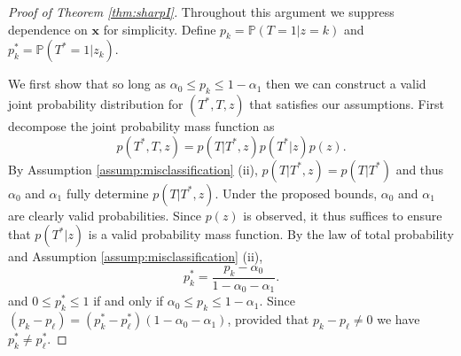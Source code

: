 \begin{proof}[Proof of Theorem \ref{thm:sharpI}]
  Throughout this argument we suppress dependence on $\mathbf{x}$ for simplicity. 
  Define $p_k = \mathbb{P}(T=1|z=k)$ and $p_k^* = \mathbb{P}(T^*=1|z_k)$.

We first show that so long as $\alpha_0 \leq p_k \leq 1 - \alpha_1$ then we can construct a valid joint probability distribution for $(T^*, T, z)$ that satisfies our assumptions.
First decompose the joint probability mass function as
\[
  p(T^*,T,z) = p(T|T^*,z)p(T^*|z)p(z).
\]
By Assumption \ref{assump:misclassification} (ii), $p(T|T^*,z) = p(T|T^*)$ and thus $\alpha_0$ and $\alpha_1$ fully determine $p(T|T^*,z)$.  
Under the proposed bounds, $\alpha_0$ and $\alpha_1$ are clearly valid probabilities.
Since $p(z)$ is observed, it thus suffices to ensure that $p(T^*|z)$ is a valid probability mass function.
By the law of total probability and Assumption \ref{assump:misclassification} (ii), 
\[
  p_k^* = \frac{p_k - \alpha_0}{1 - \alpha_0 - \alpha_1}.
\]
and $0 \leq p_k^* \leq 1$ if and only if $\alpha_0 \leq p_k \leq 1 - \alpha_1$.
Since $(p_k - p_\ell) = (p_k^* - p_\ell^*)(1 - \alpha_0 - \alpha_1)$, provided that $p_k - p_\ell \neq 0$ we have $p^*_k \neq p^*_\ell$. 


\end{proof}

